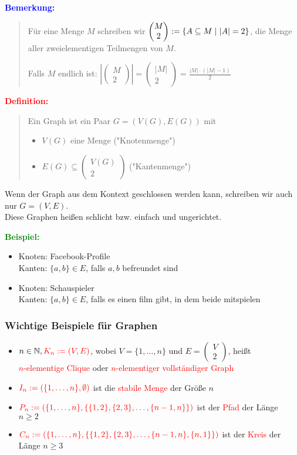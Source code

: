 \documentclass{article}
\newcommand{\smsp}{\phantom{\hspace{3px}}}
\newcommand{\red}[1]{\textcolor{red}{#1}}
\newcommand{\blue}[1]{\textcolor{blue}{#1}}
\newcommand{\green}[1]{\textcolor{green}{#1}}
\newcommand{\ex}{\green{\textbf{Beispiel: }}}
\newcommand{\de}[1]{\red{\textbf{Definition: }}\begin{quote}#1\end{quote}}
\newcommand{\an}[1]{\blue{\textbf{Bemerkung: }}\begin{quote}#1\end{quote}}
\newcommand{\N}{\mathbb{N}}
\renewcommand{\st}{\smsp | \smsp}
\newcommand{\vvec}[2]{\begin{pmatrix}#1\\#2\end{pmatrix}}
\begin{document}
\an{
    Für eine Menge $M$ schreiben wir $\vvec{M}{2} := \{A \subseteq M \st |A| = 2\}$, die Menge aller zweielementigen Teilmengen von $M$.

    Falls $M$ endlich ist: $|\vvec{M}{2}| = \vvec{|M|}{2} = \frac{|M| \cdot (|M| - 1)}{2}$
}

\de{
    Ein Graph ist ein Paar $G=(V(G), E(G))$ mit
    \begin{itemize}
        \item $V(G)$ eine Menge ("Knotenmenge")
        \item $E(G) \subseteq \vvec{V(G)}{2}$ ("Kantenmenge")
    \end{itemize}
}

Wenn der Graph aus dem Kontext geschlossen werden kann, schreiben wir auch nur $G = (V,E)$.\\
Diese Graphen heißen schlicht bzw. einfach und ungerichtet.

\ex \begin{itemize}
    \item Knoten: Facebook-Profile\\
    Kanten: $\{a,b\} \in E$, falls $a,b$ befreundet sind
    \item Knoten: Schauspieler\\
    Kanten: $\{a,b\} \in E$, falls es einen film gibt, in dem beide mitspielen
\end{itemize}

{}
\subsubsection{Wichtige Beispiele für Graphen}

\begin{itemize}
    \item $n \in \N, \red{K_n := (V,E)}$, wobei $V = \{1, \dots, n\}$ und $E = \vvec{V}{2}$, heißt\\
    \red{$n$-elementige Clique} oder \red{$n$-elementiger vollständiger Graph}
    \item $\red{I_n := (\{1, \dots, n\}, \emptyset)}$ ist die \red{stabile Menge} der Größe $n$
    \item $\red{P_n := (\{1, \dots, n\}, \{\{1,2\}, \{2,3\}, \dots, \{n-1,n\}\})}$ ist der \red{Pfad} der Länge $n \ge 2$
    \item $\red{C_n := (\{1, \dots, n\}, \{\{1,2\}, \{2,3\}, \dots, \{n-1,n\}, \{n,1\}\})}$ ist der \red{Kreis} der Länge $n \ge 3$
\end{itemize}
\end{document}
